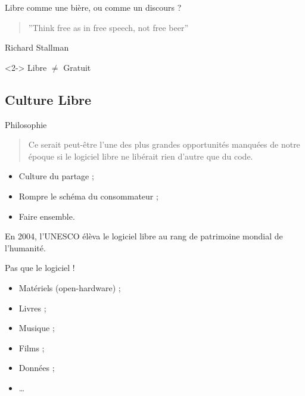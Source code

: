 \begin{frame}{Libre comme une bière, ou comme un discours ?}
  \begin{quote}\centering
    ''Think free as in free speech, not free beer''
  \end{quote}
  \begin{flushright}
    Richard Stallman
  \end{flushright}

  \begin{alertblock}<2->{}\centering
    Libre $\neq$ Gratuit
  \end{alertblock}
\end{frame}

\subsection{Culture Libre}

\begin{frame}{Philosophie}
  \begin{flushright}
    \begin{minipage}{.85\textwidth}
      \begin{quote}\footnotesize
        \og Ce serait peut-être l'une des plus grandes opportunités manquées de notre époque si le logiciel libre ne libérait rien d'autre que du code. \fg{}
      \end{quote}
    \end{minipage}
  \end{flushright}
  
  \begin{itemize}
    \item Culture du partage ;
    \item Rompre le schéma du consommateur ;
    \item Faire ensemble.
  \end{itemize}
  
\end{frame}

\begin{frame}\centering
  En 2004, l'UNESCO élèva le logiciel libre au rang de patrimoine mondial de l'humanité.
\end{frame}

\begin{frame}{Pas que le logiciel !}
  \begin{itemize}
    \item Matériels (open-hardware) ;
    \item Livres ;
    \item Musique ;
    \item Films ;
    \item Données ;
    \item \dots
  \end{itemize}
\end{frame}

